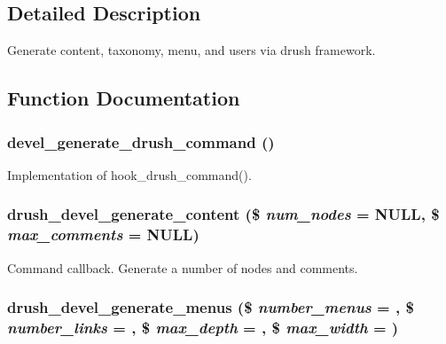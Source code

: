 \subsection{Detailed Description}
Generate content, taxonomy, menu, and users via drush framework. 

\subsection{Function Documentation}
\hypertarget{devel__generate_8drush_8inc_a48ece25ef0179ad642de2574d97b6f59}{
\subsubsection[{devel\_\-generate\_\-drush\_\-command}]{\setlength{\rightskip}{0pt plus 5cm}devel\_\-generate\_\-drush\_\-command ()}}
\label{devel__generate_8drush_8inc_a48ece25ef0179ad642de2574d97b6f59}
Implementation of hook\_\-drush\_\-command(). \hypertarget{devel__generate_8drush_8inc_aa37a3deadce02df0570ef63f711025b6}{
\subsubsection[{drush\_\-devel\_\-generate\_\-content}]{\setlength{\rightskip}{0pt plus 5cm}drush\_\-devel\_\-generate\_\-content (\$ {\em num\_\-nodes} = {\ttfamily NULL}, \/  \$ {\em max\_\-comments} = {\ttfamily NULL})}}
\label{devel__generate_8drush_8inc_aa37a3deadce02df0570ef63f711025b6}
Command callback. Generate a number of nodes and comments. \hypertarget{devel__generate_8drush_8inc_a7a543f5e7641e7fa1c6d9dee12d8b93b}{
\subsubsection[{drush\_\-devel\_\-generate\_\-menus}]{\setlength{\rightskip}{0pt plus 5cm}drush\_\-devel\_\-generate\_\-menus (\$ {\em number\_\-menus} = {}, \/  \$ {\em number\_\-links} = {}, \/  \$ {\em max\_\-depth} = {}, \/  \$ {\em max\_\-width} = {})}}
